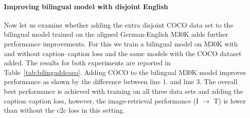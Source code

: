 \paragraph{Improving bilingual model with disjoint English}
Now let us examine whether adding the extra disjoint COCO data set to
the bilingual model trained on the aligned German-English M30K adds 
further performance improvements. 
For this we train a bilingual model on M30K with 
and without caption--caption loss and the same models with the
COCO dataset added.  The results for both experiments are reported in 
Table~\ref{tab:bilingaddcoco}. Adding COCO to the bilingual M30K 
model improves performance as shown by the difference between line 1. and
line 3. The overall best performance is achieved with training on all
three data sets and adding the caption--caption loss, however, the 
image-retrieval performance (I $\rightarrow$ T) is lower than without the 
c2c loss in this setting. 

